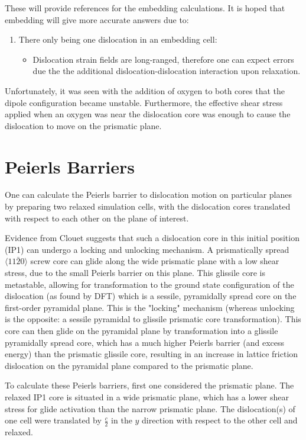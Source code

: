\documentclass[11pt]{article}
\begin{document}
These will provide references for the embedding calculations. It is
hoped that embedding will give more accurate answers due to:
\begin{enumerate}
\item There only being one dislocation in an embedding cell:
\begin{itemize}
\item Dislocation strain fields are long-ranged, therefore one can
expect errors due the the additional dislocation-dislocation
interaction upon relaxation.
\end{itemize}
\end{enumerate}


Unfortunately, it was seen with the addition of oxygen to both
cores that the dipole configuration became unstable. Furthermore,
the effective shear stress applied when an oxygen was near the
dislocation core was enough to cause the dislocation to move on the
prismatic plane. 


\section{Peierls Barriers}
\label{sec:orgbc38318}

One can calculate the Peierls barrier to dislocation motion on
particular planes by preparing two relaxed simulation cells, with
the dislocation cores translated with respect to each other on the
plane of interest. 

Evidence from Clouet \cite{Clouet2015} suggests that such a
dislocation core in this initial position (IP1) can undergo a
locking and unlocking mechanism. A prismatically spread \(\langle
  11\bar{2}0 \rangle\) screw core can glide along the wide prismatic
plane with a low shear stress, due to the small Peierls barrier on
this plane. This glissile core is metastable, allowing for
transformation to the ground state configuration of the dislocation
(as found by DFT) which is a sessile, pyramidally spread core on the
first-order pyramidal plane. This is the "locking" mechanism
(whereas unlocking is the opposite: a sessile pyramidal to glissile
prismatic core transformation). This core can then glide on the
pyramidal plane by transformation into a glissile pyramidally spread
core, which has a much higher Peierls barrier (and excess energy)
than the prismatic glissile core, resulting in an increase in
lattice friction dislocation on the pyramidal plane compared to the
prismatic plane.

To calculate these Peierls barriers, first one considered the
prismatic plane. The relaxed IP1 core is situated in a wide
prismatic plane, which has a lower shear stress for glide activation
than the narrow prismatic plane. The dislocation(s) of one cell were
translated by \(\frac{c}{2}\) in the \(y\) direction with respect to the other
cell and relaxed. 
\end{document}
